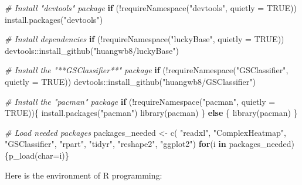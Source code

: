 \documentclass[
  12pt,
]{book}
\newenvironment{Shaded}{\begin{snugshade}}{\end{snugshade}}
\newcommand{\AttributeTok}[1]{\textcolor[rgb]{0.77,0.63,0.00}{#1}}
\newcommand{\CommentTok}[1]{\textcolor[rgb]{0.56,0.35,0.01}{\textit{#1}}}
\newcommand{\ConstantTok}[1]{\textcolor[rgb]{0.00,0.00,0.00}{#1}}
\newcommand{\ControlFlowTok}[1]{\textcolor[rgb]{0.13,0.29,0.53}{\textbf{#1}}}
\newcommand{\FunctionTok}[1]{\textcolor[rgb]{0.00,0.00,0.00}{#1}}
\newcommand{\NormalTok}[1]{#1}
\newcommand{\OtherTok}[1]{\textcolor[rgb]{0.56,0.35,0.01}{#1}}
\newcommand{\SpecialCharTok}[1]{\textcolor[rgb]{0.00,0.00,0.00}{#1}}
\newcommand{\StringTok}[1]{\textcolor[rgb]{0.31,0.60,0.02}{#1}}
\begin{document}
\begin{Shaded}
\begin{Highlighting}[]

\CommentTok{\# Install "devtools" package}
\ControlFlowTok{if}\NormalTok{ (}\SpecialCharTok{!}\FunctionTok{requireNamespace}\NormalTok{(}\StringTok{"devtools"}\NormalTok{, }\AttributeTok{quietly =} \ConstantTok{TRUE}\NormalTok{))}
  \FunctionTok{install.packages}\NormalTok{(}\StringTok{"devtools"}\NormalTok{)}

\CommentTok{\# Install dependencies}
\ControlFlowTok{if}\NormalTok{ (}\SpecialCharTok{!}\FunctionTok{requireNamespace}\NormalTok{(}\StringTok{"luckyBase"}\NormalTok{, }\AttributeTok{quietly =} \ConstantTok{TRUE}\NormalTok{))}
\NormalTok{  devtools}\SpecialCharTok{::}\FunctionTok{install\_github}\NormalTok{(}\StringTok{"huangwb8/luckyBase"}\NormalTok{)}

\CommentTok{\# Install the "**GSClassifier**" package}
\ControlFlowTok{if}\NormalTok{ (}\SpecialCharTok{!}\FunctionTok{requireNamespace}\NormalTok{(}\StringTok{"GSClassifier"}\NormalTok{, }\AttributeTok{quietly =} \ConstantTok{TRUE}\NormalTok{))}
\NormalTok{  devtools}\SpecialCharTok{::}\FunctionTok{install\_github}\NormalTok{(}\StringTok{"huangwb8/GSClassifier"}\NormalTok{)}

\CommentTok{\# Install the "pacman" package}
\ControlFlowTok{if}\NormalTok{ (}\SpecialCharTok{!}\FunctionTok{requireNamespace}\NormalTok{(}\StringTok{"pacman"}\NormalTok{, }\AttributeTok{quietly =} \ConstantTok{TRUE}\NormalTok{))\{}
  \FunctionTok{install.packages}\NormalTok{(}\StringTok{"pacman"}\NormalTok{)}
  \FunctionTok{library}\NormalTok{(pacman)}
\NormalTok{\} }\ControlFlowTok{else}\NormalTok{ \{}
  \FunctionTok{library}\NormalTok{(pacman)}
\NormalTok{\}}

\CommentTok{\# Load needed packages}
\NormalTok{packages\_needed }\OtherTok{\textless{}{-}} \FunctionTok{c}\NormalTok{(}
  \StringTok{"readxl"}\NormalTok{,}
  \StringTok{"ComplexHeatmap"}\NormalTok{,}
  \StringTok{"GSClassifier"}\NormalTok{,}
  \StringTok{"rpart"}\NormalTok{,}
  \StringTok{"tidyr"}\NormalTok{,}
  \StringTok{"reshape2"}\NormalTok{,}
  \StringTok{"ggplot2"}\NormalTok{)}
\ControlFlowTok{for}\NormalTok{(i }\ControlFlowTok{in}\NormalTok{ packages\_needed)\{}\FunctionTok{p\_load}\NormalTok{(}\AttributeTok{char=}\NormalTok{i)\}}
\end{Highlighting}
\end{Shaded}

Here is the environment of R programming:
\end{document}
